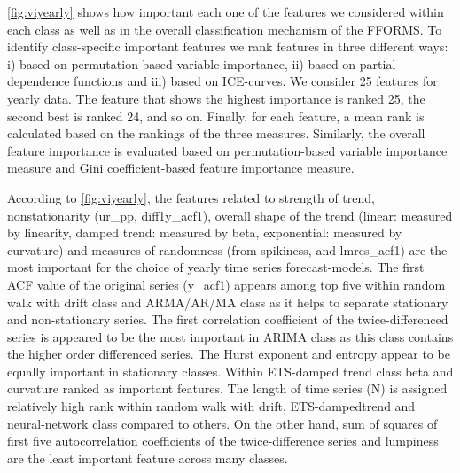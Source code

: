 \documentclass[11pt,a4paper,]{article}
\begin{document}
\autoref{fig:viyearly} shows how important each one of the features we
considered within each class as well as in the overall classification
mechanism of the FFORMS. To identify class-specific important features
we rank features in three different ways: i) based on permutation-based
variable importance, ii) based on partial dependence functions and iii)
based on ICE-curves. We consider 25 features for yearly data. The
feature that shows the highest importance is ranked 25, the second best
is ranked 24, and so on. Finally, for each feature, a mean rank is
calculated based on the rankings of the three measures. Similarly, the
overall feature importance is evaluated based on permutation-based
variable importance measure and Gini coefficient-based feature
importance measure.

According to \autoref{fig:viyearly}, the features related to strength of
trend, nonstationarity (ur\_pp, diff1y\_acf1), overall shape of the
trend (linear: measured by linearity, damped trend: measured by beta,
exponential: measured by curvature) and measures of randomness (from
spikiness, and lmres\_acf1) are the most important for the choice of
yearly time series forecast-models. The first ACF value of the original
series (y\_acf1) appears among top five within random walk with drift
class and ARMA/AR/MA class as it helps to separate stationary and
non-stationary series. The first correlation coefficient of the
twice-differenced series is appeared to be the most important in ARIMA
class as this class contains the higher order differenced series. The
Hurst exponent and entropy appear to be equally important in stationary
classes. Within ETS-damped trend class beta and curvature ranked as
important features. The length of time series (N) is assigned relatively
high rank within random walk with drift, ETS-dampedtrend and
neural-network class compared to others. On the other hand, sum of
squares of first five autocorrelation coefficients of the
twice-difference series and lumpiness are the least important feature
across many classes.
\end{document}
